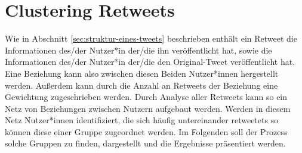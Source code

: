 \chapter{Clustering Retweets}
\label{chap:cluster_retweets}
Wie in Abschnitt \ref{sec:struktur-eines-tweets} beschrieben enthält ein \gls{Retweet} die Informationen des/der Nutzer*in der/die ihn veröffentlicht hat, sowie die Informationen des/der Nutzer*in der/die den Original-Tweet veröffentlicht hat. Eine Beziehung kann also zwischen diesen Beiden Nutzer*innen hergestellt werden. Außerdem kann durch die Anzahl an \glspl{Retweet} der Beziehung eine Gewichtung zugeschrieben werden. Durch Analyse aller \glspl{Retweet} kann so ein Netz von Beziehungen zwischen Nutzern aufgebaut werden.
Werden in diesem Netz Nutzer*innen identifiziert, die sich häufig untereinander \glspl{retweetet} so können diese einer Gruppe zugeordnet werden. Im Folgenden soll der Prozess solche Gruppen zu finden, dargestellt und die Ergebnisse präsentiert werden.

